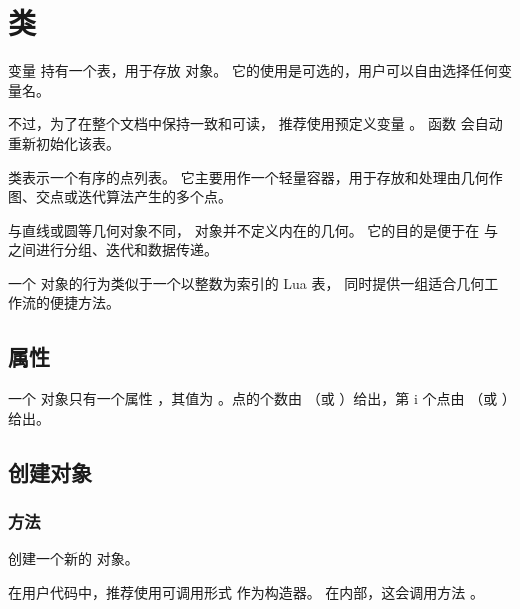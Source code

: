 \section{ 类}
\label{sec:class_list_point}

变量  持有一个表，用于存放  对象。
它的使用是可选的，用户可以自由选择任何变量名。

\medskip

不过，为了在整个文档中保持一致和可读，
推荐使用预定义变量 。
函数  会自动重新初始化该表。

\medskip

 类表示一个有序的点列表。
它主要用作一个轻量容器，用于存放和处理由几何作图、交点或迭代算法产生的多个点。

与直线或圆等几何对象不同， 对象并不定义内在的几何。
它的目的是便于在  与  之间进行分组、迭代和数据传递。

\medskip

一个  对象的行为类似于一个以整数为索引的 Lua 表，
同时提供一组适合几何工作流的便捷方法。

\medskip

\subsection{属性}
\label{subsec:list_point_attributes}

一个  对象只有一个属性 ，其值为 。点的个数由 （或 ）给出，第 i 个点由 （或 ）给出。

\subsection{创建对象}
\label{subsec:list_point_create}

\subsubsection{方法 }
\label{ssub:meth_list_point_new}

创建一个新的  对象。

在用户代码中，推荐使用可调用形式  作为构造器。
在内部，这会调用方法 。

